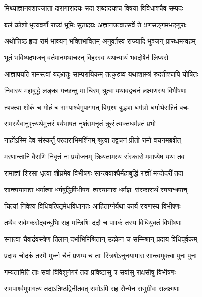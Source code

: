 \twolineshloka
{मिथ्याज्ञानवशाज्जाता दारागारादयः सदा}
{शब्दादयश्च विषया विविधाश्चैव सम्पदः} %

\twolineshloka
{बलं कोशो भृत्यवर्गो राज्यं भूमिः सुतादयः}
{अज्ञानजत्वात्सर्वे ते क्षणसङ्गमभङ्गुराः} %

\twolineshloka
{अथोत्तिष्ठ हृदा रामं भावयन् भक्तिभावितम्}
{अनुवर्तस्व राज्यादि भुञ्जन् प्रारब्धमन्वहम्} %

\twolineshloka
{भूतं भविष्यदभजन् वर्तमानमथाचरन्}
{विहरस्व यथान्यायं भवदोषैर्न लिप्यसे} %

\twolineshloka
{आज्ञापयति रामस्त्वां यद्भ्रातुः साम्परायिकम्}
{तत्कुरुष्व यथाशास्त्रं रुदतीश्चापि योषितः} %

\twolineshloka
{निवारय महाबुद्धे लङ्कां गच्छन्तु मा चिरम्}
{श्रुत्वा यथावद्वचनं लक्ष्मणस्य विभीषणः} %

\twolineshloka
{त्यक्त्वा शोकं च मोहं च रामपार्श्वमुपागमत्}
{विमृश्य बुद्ध्या धर्मज्ञो धर्मार्थसहितं वचः} %

\twolineshloka
{रामस्यैवानुवृत्त्यर्थमुत्तरं पर्यभाषत}
{नृशंसमनृतं क्रूरं त्यक्तधर्मव्रतं प्रभो} %

\twolineshloka
{नार्होऽस्मि देव संस्कर्तुं परदाराभिमर्शिनम्}
{श्रुत्वा तद्वचनं प्रीतो रामो वचनमब्रवीत्} %

\twolineshloka
{मरणान्तानि वैराणि निवृत्तं नः प्रयोजनम्}
{क्रियतामस्य संस्कारो ममाप्येष यथा तव} %

\twolineshloka
{रामाज्ञां शिरसा धृत्वा शीघ्रमेव विभीषणः}
{सान्त्ववाक्यैर्महाबुद्धिं राज्ञीं मन्दोदरीं तदा} %

\twolineshloka
{सान्त्वयामास धर्मात्मा धर्मबुद्धिर्विभीषणः}
{त्वरयामास धर्मज्ञः संस्कारार्थं स्वबान्धवान्} %

\twolineshloka
{चित्यां निवेश्य विधिवत्पितृमेधविधानतः}
{आहिताग्नेर्यथा कार्यं रावणस्य विभीषणः} %

\twolineshloka
{तथैव सर्वमकरोद्बन्धुभिः सह मन्त्रिभिः}
{ददौ च पावकं तस्य विधियुक्तं विभीषणः} %

\twolineshloka
{स्नात्वा चैवार्द्रवस्त्रेण तिलान् दर्भाभिमिश्रितान्}
{उदकेन च सम्मिश्रान् प्रदाय विधिपूर्वकम्} %

\twolineshloka
{प्रदाय चोदकं तस्मै मुर्ध्ना चैनं प्रणम्य च}
{ताः स्त्रियोऽनुनयामास सान्त्वमुक्त्वा पुनः पुनः} %

\twolineshloka
{गम्यतामिति ताः सर्वा विविशुर्नगरं तदा}
{प्रविष्टासु च सर्वासु राक्षसीषु विभीषणः} %

\twolineshloka
{रामपार्श्वमुपागत्य तदाऽतिष्ठद्विनीतवत्}
{रामोऽपि सह सैन्येन ससुग्रीवः सलक्ष्मणः} %

